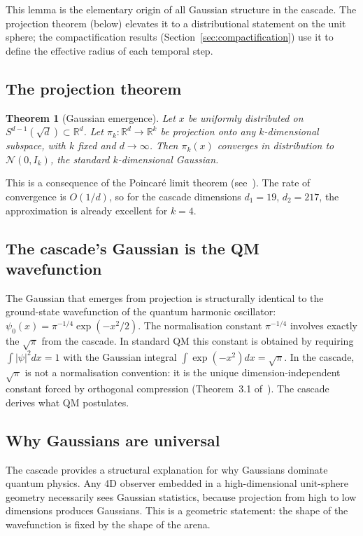 \documentclass[12pt,a4paper]{article}
\newtheorem{theorem}{Theorem}[section]
\begin{document}
This lemma is the elementary origin of all Gaussian structure in the cascade. The
projection theorem (below) elevates it to a distributional statement on the unit
sphere; the compactification results (Section~\ref{sec:compactification}) use it to
define the effective radius of each temporal step.

\subsection{The projection theorem}

\begin{theorem}[Gaussian emergence]\label{thm:gaussian}
Let $x$ be uniformly distributed on $S^{d-1}(\sqrt{d})\subset\mathbb{R}^d$. Let
$\pi_k:\mathbb{R}^d\to\mathbb{R}^k$ be projection onto any $k$-dimensional subspace, with
$k$ fixed and $d\to\infty$. Then $\pi_k(x)$ converges in distribution to
$\mathcal{N}(0,I_k)$, the standard $k$-dimensional Gaussian.
\end{theorem}

This is a consequence of the Poincar\'{e} limit theorem (see~\cite{ledoux,milman}). The
rate of convergence is $O(1/d)$, so for the cascade dimensions $d_1=19$, $d_2=217$, the
approximation is already excellent for $k=4$.

\subsection{The cascade's Gaussian is the QM wavefunction}

The Gaussian that emerges from projection is structurally identical to the ground-state
wavefunction of the quantum harmonic oscillator:
$\psi_0(x)=\pi^{-1/4}\exp(-x^2/2)$. The normalisation constant $\pi^{-1/4}$ involves
exactly the $\sqrt{\pi}$ from the cascade. In standard QM this constant is obtained by
requiring $\int|\psi|^2dx=1$ with the Gaussian integral $\int\exp(-x^2)dx=\sqrt{\pi}$.
In the cascade, $\sqrt{\pi}$ is not a normalisation convention: it is the unique
dimension-independent constant forced by orthogonal compression (Theorem~3.1
of~\cite{part0}). The cascade derives what QM postulates.

\subsection{Why Gaussians are universal}

The cascade provides a structural explanation for why Gaussians dominate quantum physics.
Any 4D observer embedded in a high-dimensional unit-sphere geometry necessarily sees
Gaussian statistics, because projection from high to low dimensions produces Gaussians.
This is a geometric statement: the shape of the wavefunction is fixed by the shape of
the arena.
\end{document}
